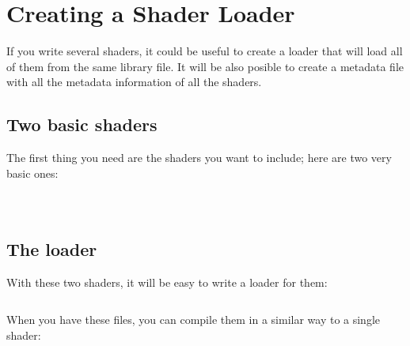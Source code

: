 \section{Creating a Shader Loader}


If you write several shaders, it could be useful to create a loader that will load all of them from the same library file.
It will be also posible to create a metadata file with all the metadata information of all the shaders.

\subsection{Two basic shaders}

The first thing you need are the shaders you want to include; here are two very basic ones:

\inputminted[mathescape,
linenos,
numbersep=5pt,
frame=lines,
framesep=2mm,
baselinestretch=1,
fontsize=\footnotesize,
tabsize=3,
label=myShader1.cpp]
{c++}{myShader1.cpp}

$ $\\

\inputminted[mathescape,
linenos,
numbersep=5pt,
frame=lines,
framesep=2mm,
baselinestretch=1,
fontsize=\footnotesize,
tabsize=3,
label=myShader2.cpp]
{c++}{myShader2.cpp}

\subsection{The loader}

With these two shaders, it will be easy to write a loader for them:

\inputminted[mathescape,
linenos,
numbersep=5pt,
frame=lines,
framesep=2mm,
baselinestretch=1,
fontsize=\footnotesize,
tabsize=3,
label=loader.cpp]
{c++}{loader.cpp}

When you have these files, you can compile them in a similar way to a single shader:



